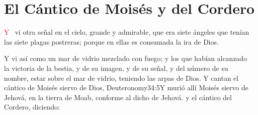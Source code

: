 
\chapter{El Cántico de Moisés y del Cordero}
\lettrine[lines=3,slope=-0.5em,loversize=0.1]{\textcolor{red}{Y}}{\ } vi otra señal en el cielo, grande y admirable, que era siete ángeles que tenían las siete plagas%
 postreras; porque en ellas es consumada la ira de Dios.
\newline

\zz
{}Y vi así como un mar de vidrio mezclado con fuego; y los que habían alcanzado la victoria de la bestia, y de su imagen, y de su señal, y del número de su nombre, estar sobre el mar de vidrio, teniendo las arpas de Dios.
Y cantan el cántico de Moisés%
 siervo de Dios,%
				   {Deuteronomy}{34:5}{Y murió allí Moisés siervo de Jehová, en la tierra de Moab, conforme al dicho de Jehová.}
 y el cántico del Cordero, diciendo:
